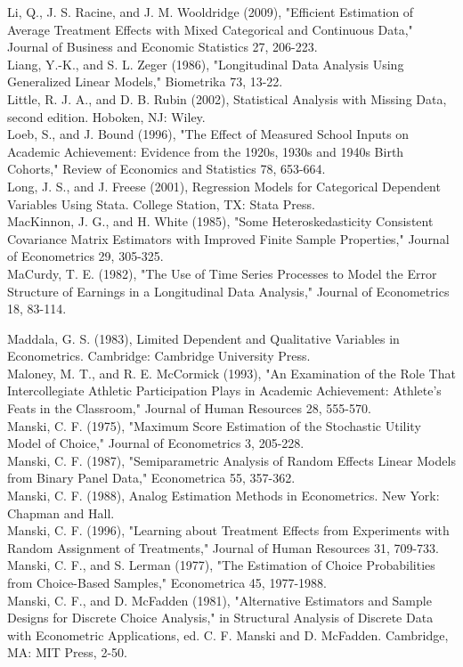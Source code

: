 \documentclass[10pt]{article}
\begin{document}
Li, Q., J. S. Racine, and J. M. Wooldridge (2009), "Efficient Estimation of Average Treatment Effects with Mixed Categorical and Continuous Data," Journal of Business and Economic Statistics 27, 206-223.\\
Liang, Y.-K., and S. L. Zeger (1986), "Longitudinal Data Analysis Using Generalized Linear Models," Biometrika 73, 13-22.\\
Little, R. J. A., and D. B. Rubin (2002), Statistical Analysis with Missing Data, second edition. Hoboken, NJ: Wiley.\\
Loeb, S., and J. Bound (1996), "The Effect of Measured School Inputs on Academic Achievement: Evidence from the 1920s, 1930s and 1940s Birth Cohorts," Review of Economics and Statistics 78, 653-664.\\
Long, J. S., and J. Freese (2001), Regression Models for Categorical Dependent Variables Using Stata. College Station, TX: Stata Press.\\
MacKinnon, J. G., and H. White (1985), "Some Heteroskedasticity Consistent Covariance Matrix Estimators with Improved Finite Sample Properties," Journal of Econometrics 29, 305-325.\\
MaCurdy, T. E. (1982), "The Use of Time Series Processes to Model the Error Structure of Earnings in a Longitudinal Data Analysis," Journal of Econometrics 18, 83-114.

Maddala, G. S. (1983), Limited Dependent and Qualitative Variables in Econometrics. Cambridge: Cambridge University Press.\\
Maloney, M. T., and R. E. McCormick (1993), "An Examination of the Role That Intercollegiate Athletic Participation Plays in Academic Achievement: Athlete's Feats in the Classroom," Journal of Human Resources 28, 555-570.\\
Manski, C. F. (1975), "Maximum Score Estimation of the Stochastic Utility Model of Choice," Journal of Econometrics 3, 205-228.\\
Manski, C. F. (1987), "Semiparametric Analysis of Random Effects Linear Models from Binary Panel Data," Econometrica 55, 357-362.\\
Manski, C. F. (1988), Analog Estimation Methods in Econometrics. New York: Chapman and Hall.\\
Manski, C. F. (1996), "Learning about Treatment Effects from Experiments with Random Assignment of Treatments," Journal of Human Resources 31, 709-733.\\
Manski, C. F., and S. Lerman (1977), "The Estimation of Choice Probabilities from Choice-Based Samples," Econometrica 45, 1977-1988.\\
Manski, C. F., and D. McFadden (1981), "Alternative Estimators and Sample Designs for Discrete Choice Analysis," in Structural Analysis of Discrete Data with Econometric Applications, ed. C. F. Manski and D. McFadden. Cambridge, MA: MIT Press, 2-50.
\end{document}
